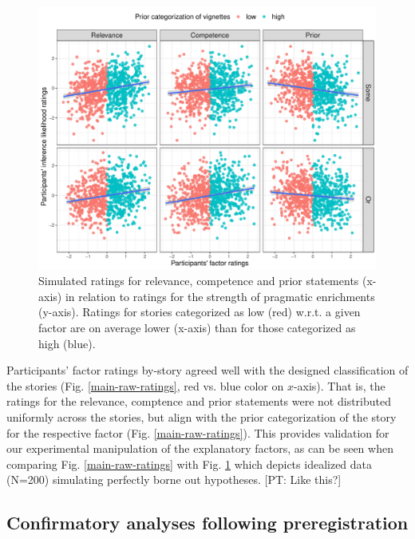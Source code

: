 \documentclass{sp}
\newcommand{\pt}[1]{\textcolor{Cerulean}{[PT: #1]}}
\begin{document}
\begin{figure}[h]
	\begin{center}
		\includegraphics[width=1\linewidth]{images/idealized_data_N200_b015.pdf}
	\end{center}
	\vspace{-0.3cm}
	\caption{Simulated ratings for relevance, competence and prior statements (x-axis) in relation to ratings for the strength of pragmatic enrichments (y-axis). Ratings for stories categorized as low (red) w.r.t. a given factor are on average lower (x-axis) than for those categorized as high (blue).}
	\label{main-sim-ratings}
\end{figure}

Participants’ factor ratings by-story agreed well with the designed classification of the stories (Fig. \ref{main-raw-ratings}, red vs. blue color on $x$-axis). That is, the ratings for the relevance, comptence and prior statements were not distributed uniformly across the stories, but align with the prior categorization of the story for the respective factor (Fig. \ref{main-raw-ratings}). This provides validation for our experimental manipulation of the explanatory factors, as can be seen when comparing Fig. \ref{main-raw-ratings} with Fig. \ref{main-sim-ratings} which depicts idealized data (N=200) simulating perfectly borne out hypotheses. \pt{Like this?}

\subsection{Confirmatory analyses following preregistration}
\end{document}

